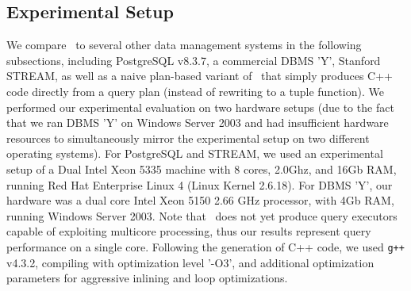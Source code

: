 \subsection{Experimental Setup}
We compare \compiler\ to several other data management systems in the following
subsections, including PostgreSQL v8.3.7, a commercial DBMS 'Y', Stanford STREAM,
as well as a naive plan-based variant of \compiler\ that simply produces C++ code
directly from a query plan (instead of rewriting to a tuple function). We
performed our experimental evaluation on two hardware setups (due to the fact
that we ran DBMS 'Y' on Windows Server 2003 and had insufficient hardware
resources to simultaneously mirror the experimental setup on two different
operating systems). For PostgreSQL and STREAM, we used an experimental setup of a
Dual Intel Xeon 5335 machine with 8 cores, 2.0Ghz, and 16Gb RAM, running Red Hat
Enterprise Linux 4 (Linux Kernel 2.6.18). For DBMS 'Y', our hardware was a dual
core Intel Xeon 5150 2.66 GHz processor, with 4Gb RAM, running Windows Server
2003. Note that \compiler\ does not yet produce query executors capable of
exploiting multicore processing, thus our results represent query performance on
a single core. Following the generation of C++ code, we used \texttt{g++} v4.3.2,
compiling with optimization level '-O3', and additional optimization parameters
for aggressive inlining and loop optimizations.


